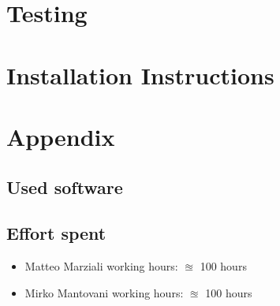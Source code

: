 \documentclass{article}
\begin{document}
\clearpage
\section{Testing}

\clearpage
\section{Installation Instructions}




\clearpage
\section{Appendix}

\subsection{Used software}


\subsection{Effort spent}
\begin{itemize}

\item Matteo Marziali working hours:  $\approxeq$ 100 hours

\item Mirko Mantovani working hours:  $\approxeq$ 100 hours



\end{itemize}
\end{document}

